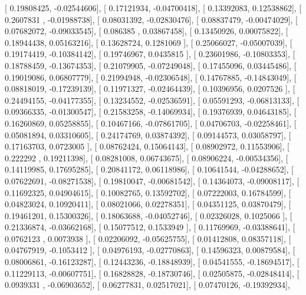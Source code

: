\documentclass{article}
\begin{document}
       [ 0.19808425, -0.02544606],
       [ 0.17121934, -0.04700418],
       [ 0.13392083,  0.12538862],
       [ 0.2607831 , -0.01988738],
       [ 0.08031392, -0.02830476],
       [ 0.08837479, -0.00474029],
       [ 0.07682072, -0.09033545],
       [ 0.086385  ,  0.03867458],
       [ 0.13450926,  0.00075822],
       [ 0.18944438,  0.05163216],
       [ 0.13628724,  0.1281069 ],
       [ 0.25066027, -0.05007039],
       [ 0.19174419, -0.10384142],
       [ 0.19746967,  0.0435815 ],
       [ 0.23601986, -0.10803353],
       [ 0.18788459, -0.13674353],
       [ 0.21079905, -0.07249048],
       [ 0.17455096,  0.03445486],
       [ 0.19019086,  0.06807779],
       [ 0.21994948, -0.02306548],
       [ 0.14767885, -0.14843049],
       [ 0.08818019, -0.17239139],
       [ 0.11971327, -0.02464439],
       [ 0.10396956,  0.0207526 ],
       [ 0.24494155, -0.04177355],
       [ 0.13234552, -0.02536591],
       [ 0.05591293, -0.06813133],
       [ 0.09366335, -0.01300547],
       [ 0.21583258, -0.14069934],
       [ 0.19376939,  0.04643185],
       [ 0.16260869,  0.05258855],
       [ 0.10467166, -0.07861705],
       [ 0.04706703, -0.02258461],
       [ 0.05081894,  0.03310605],
       [ 0.24174769,  0.03874392],
       [ 0.09144573,  0.03058797],
       [ 0.17163703,  0.0723005 ],
       [ 0.08762424,  0.15064143],
       [ 0.08902972,  0.11553906],
       [ 0.222292  ,  0.19211398],
       [ 0.08281008,  0.06743675],
       [ 0.08906224, -0.00534356],
       [ 0.14119985,  0.17695285],
       [ 0.20841172,  0.06118986],
       [ 0.10641544, -0.04288652],
       [ 0.07622691, -0.08271538],
       [ 0.19810047, -0.00681542],
       [ 0.14364073, -0.09008117],
       [ 0.11692325,  0.04904615],
       [ 0.10082765,  0.13592702],
       [ 0.07222003,  0.16784599],
       [ 0.04823024,  0.10920411],
       [ 0.08021066,  0.02278351],
       [ 0.04351125,  0.03870479],
       [ 0.19461201,  0.15300326],
       [ 0.18063688, -0.04052746],
       [ 0.02326028,  0.1025066 ],
       [ 0.21336874, -0.03662168],
       [ 0.15077512,  0.1533949 ],
       [ 0.11769969, -0.03388641],
       [ 0.0762123 ,  0.0073938 ],
       [ 0.02206092, -0.05625755],
       [ 0.01412808,  0.08357118],
       [ 0.04767919, -0.1053412 ],
       [ 0.04976193, -0.02770863],
       [ 0.14596323,  0.00879584],
       [ 0.08006861, -0.16123287],
       [ 0.12443236, -0.18848939],
       [ 0.04541555, -0.18694517],
       [ 0.11229113, -0.00607751],
       [ 0.16828828, -0.18730746],
       [ 0.02505875, -0.02848414],
       [ 0.0939331 , -0.06903652],
       [ 0.06277831,  0.02517021],
       [ 0.07470126, -0.19392934],
\end{document}
